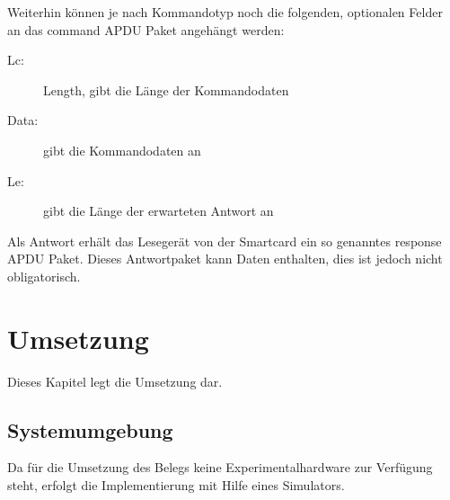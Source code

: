 \documentclass[a4paper,12pt]{scrartcl}
\begin{document}
Weiterhin können je nach Kommandotyp noch die folgenden, optionalen Felder an das command APDU Paket angehängt werden:


\begin{description}
\item[Lc:] Length, gibt die Länge der Kommandodaten
\item[Data:] gibt die Kommandodaten an
\item[Le:] gibt die Länge der erwarteten Antwort an
\end{description}

Als Antwort erhält das Lesegerät von der Smartcard ein so genanntes response APDU Paket. Dieses Antwortpaket kann Daten enthalten, dies ist jedoch nicht obligatorisch. 


\clearpage
\section{Umsetzung}
\label{sec:3}

Dieses Kapitel legt die Umsetzung dar.

\subsection{Systemumgebung}
\label{subsec:3.1}



Da für die Umsetzung des Belegs keine Experimentalhardware zur Verfügung steht, erfolgt die Implementierung mit Hilfe eines Simulators.
\end{document}

